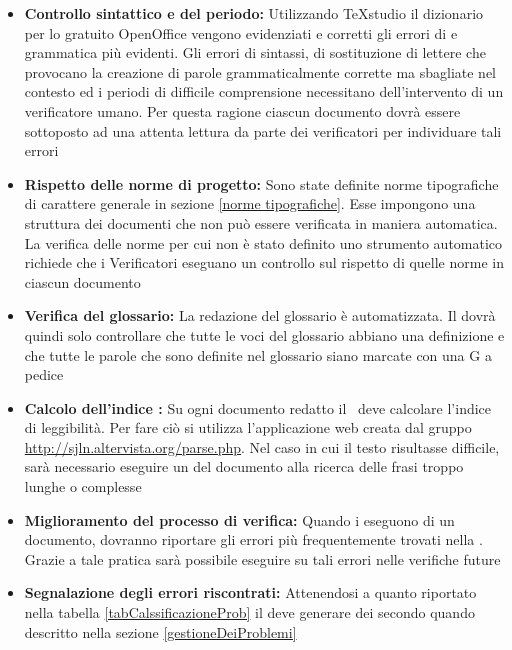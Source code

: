 \documentclass[12pt,a4paper]{article}
\begin{document}
\begin{itemize}
	\item \textbf{Controllo sintattico e del periodo:} Utilizzando TeXstudio il dizionario per lo  gratuito OpenOffice vengono evidenziati e corretti gli errori di  e grammatica più evidenti. Gli errori di sintassi, di sostituzione di lettere che provocano la creazione di parole grammaticalmente corrette ma sbagliate nel contesto ed i periodi di difficile comprensione necessitano dell'intervento di un verificatore umano. Per questa ragione ciascun documento dovrà essere sottoposto ad una attenta lettura da parte dei verificatori per individuare tali errori
	\item \textbf{Rispetto delle norme di progetto:} Sono state definite norme tipografiche di carattere generale in \NdP{} sezione \ref{norme tipografiche}. Esse impongono una struttura dei documenti che non può essere verificata in maniera automatica. La verifica delle norme per cui non è stato definito uno strumento automatico richiede che i Verificatori eseguano un controllo sul rispetto di quelle norme in ciascun documento
	\item \textbf{Verifica del glossario:} La redazione del glossario è automatizzata. Il \VR{} dovrà quindi solo controllare che tutte le voci del glossario abbiano una definizione e che tutte le parole che sono definite nel glossario siano marcate con una G a pedice
	\item \textbf{Calcolo dell’indice :} Su ogni documento redatto il \VR\ deve calcolare l’indice di leggibilità. Per fare ciò si utilizza l'applicazione web creata dal gruppo \url{http://sjln.altervista.org/parse.php}. Nel caso in cui il testo risultasse difficile, sarà necessario eseguire un  del documento alla ricerca delle frasi troppo lunghe o complesse
	\item \textbf{Miglioramento del processo di verifica:} Quando i \VRpl{} eseguono  di un documento, dovranno riportare gli errori più frequentemente trovati nella . Grazie a tale pratica sarà possibile eseguire  su tali errori nelle verifiche future
	\item \textbf{Segnalazione degli errori riscontrati:} Attenendosi a quanto riportato nella tabella \ref{tabCalssificazioneProb} il \VR{} deve generare dei  secondo quando descritto nella sezione \ref{gestioneDeiProblemi}
\end{itemize}
\end{document}
